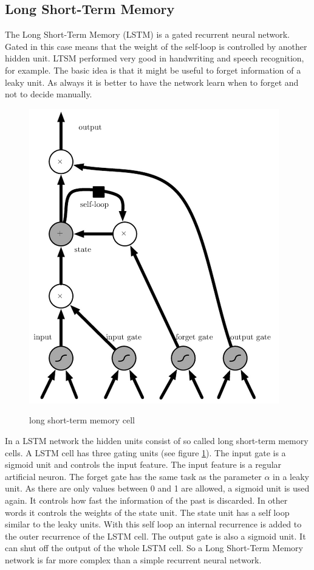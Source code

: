 \subsection{Long Short-Term Memory}
The Long Short-Term Memory (LSTM) is a gated recurrent neural network. Gated in this case means that the weight of the self-loop is controlled by another hidden unit. LTSM performed very good in handwriting and speech recognition, for example. The basic idea is that it might be useful to forget information of a leaky unit. As always it is better to have the network learn when to forget and not to decide manually.\\
\label{sec:lstm}
\begin{figure}[thb]
	\caption{long short-term memory cell \cite[p. 405]{DeepLearning}}
	\includegraphics[width=0.95\linewidth]{images/lstmCell.PNG}
	\label{fig:lstm}
\end{figure}
In a LSTM network the hidden units consist of so called long short-term memory cells. A LSTM cell has three gating units (see figure \ref{fig:lstm}). The input gate is a sigmoid unit and controls the input feature. The input feature is a regular artificial neuron. The forget gate has the same task as the parameter $\alpha$ in a leaky unit. As there are only values between 0 and 1 are allowed, a sigmoid unit is used again. It controls how fast the information of the past is discarded. In other words it controls the weights of the state unit. The state unit has a self loop similar to the leaky units. With this self loop an internal recurrence is added to the outer recurrence of the LSTM cell. The output gate is also a sigmoid unit. It can shut off the output of the whole LSTM cell. So a Long Short-Term Memory network is far more complex than a simple recurrent neural network.
